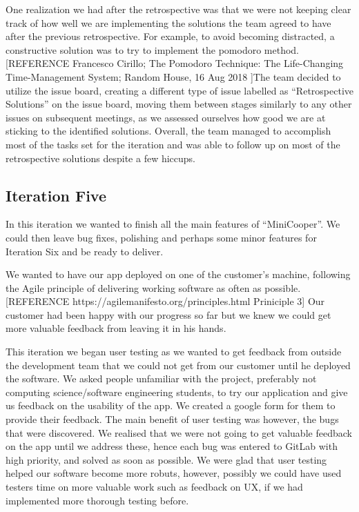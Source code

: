 \documentclass{l3proj}
\begin{document}
One realization we had after the retrospective was that we were not keeping clear track of how well we are implementing the solutions the team agreed to have after the previous retrospective. For example, to avoid becoming distracted, a constructive solution was to try to implement the pomodoro method. [REFERENCE Francesco Cirillo; The Pomodoro Technique: The Life-Changing Time-Management System; Random House, 16 Aug 2018 ]The team decided to utilize the issue board, creating a different type of issue labelled as “Retrospective Solutions” on the issue board, moving them between stages similarly to any other issues on subsequent meetings, as we assessed ourselves how good we are at sticking to the identified solutions. Overall, the team managed to accomplish most of the tasks set for the iteration and was able to follow up on most of the retrospective solutions despite a few hiccups.


\subsection{Iteration Five}

In this iteration we wanted to finish all the main features of ``MiniCooper''. We could then leave bug fixes, polishing and perhaps some minor features for Iteration Six and be ready to deliver.

We wanted to have our app deployed on one of the customer’s machine, following the Agile principle of delivering working software as often as possible. [REFERENCE https://agilemanifesto.org/principles.html Priniciple 3] Our customer had been happy with our progress so far but we knew we could get more valuable feedback from leaving it in his hands.  

This iteration we began user testing as we wanted to get feedback from outside the development team that we could not get from our customer until he deployed the software. We asked people unfamiliar with the project, preferably not computing science/software engineering students, to try our application and give us feedback on the usability of the app. We created a google form for them to provide their feedback. The main benefit of user testing was however, the bugs that were discovered. We realised that we were not going to get valuable feedback on the app until we address these, hence each bug was entered to GitLab with high priority, and solved as soon as possible.
We were glad that user testing helped our software become more robuts, however, possibly we could have used testers time on more valuable work such as feedback on UX, if we had implemented more thorough testing before.
\end{document}
